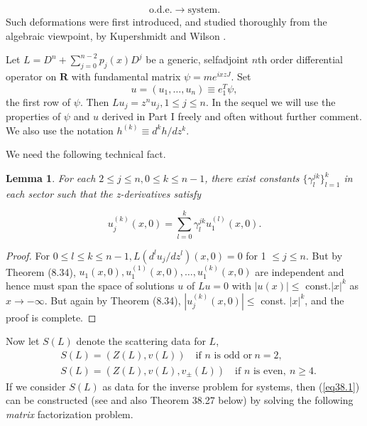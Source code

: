 \documentclass{surv-l}
\theoremstyle{plain}
\newtheorem{lem}[theorem]{\sc Lemma}
\theoremstyle{definition}
\numberwithin{equation}{chapter}
\begin{document}
\begin{equation*}
\mathrm{o.d.e}. \rightarrow \mathrm{system}.
\end{equation*}
Such deformations were first introduced, and studied thoroughly from the algebraic viewpoint, by Kupershmidt and Wilson \cite{KW}.

Let $L=D^{n}+ \sum_{j=0}^{n-2}p_{j}(x)D^{j}$ be a generic, selfadjoint $n$th order differential operator on $\textbf{R}$ with fundamental matrix $\psi=me^{ixzJ}$. Set
\begin{equation}\label{eq38.2}
u=(u_{1},\ldots,u_{n})\equiv e_{1}^{T}\psi,
\end{equation}
the first row of $\psi$. Then $Lu_{j}=z^{n}u_{j},1\leq j\leq n$. In the sequel we will use the properties of $\psi$ and $u$ derived in Part I freely and often without further comment. We also use the notation $h^{(k)}\equiv d^{k}h/dz^{k}$.

We need the following technical fact.
\renewcommand\thetheorem{38.\arabic{theorem}}
\setcounter{theorem}{2}
\begin{lem}\label{lem38.3}
For each $2\leq j\leq n, 0\leq k\leq n-1$, there exist constants $\{\gamma_{l}^{j k}\}_{l=1}^{k}$ in each sector such that the z-derivatives satisfy
\end{lem}
\setcounter{equation}{3}
\begin{equation}\label{eq38.4}
u_{j}^{(k)}(x,0)=\sum_{l=0}^{k}\gamma_{l}^{jk}u_{1}^{(l)}(x,0).
\end{equation}

\begin{proof}
For $0\leq l\leq k\leq n -1, L(d^{l}u_{j}/dz^{l})(x,0)=0$ for 1 $\leq j\leq n.$ But by Theorem (8.34), $u_{1}(x, 0),u_{1}^{(1)}(x, 0),\ldots,u_{1}^{(k)}(x,0)$ are independent and hence must span the space of solutions $u$ of $Lu=0$ with $|u(x)|\leq$ const.$|x|^{k}$ as $ x\rightarrow-\infty$. But again by Theorem (8.34), $|u_{j}^{(k)}(x, 0)|\leq$ const. $|x|^{k}$, and the proof is complete.
\end{proof}

Now let $S(L)$ denote the scattering data for $L$,
\begin{align*}
&S(L)=(Z(L),v(L))\quad \text{if $n$ is odd or}\ n =2, \\
&S(L)=(Z(L),v(L),v_{\pm}(L))\quad \text{if $n$ is even},\ n\geq 4.
\end{align*}
If we consider $S(L)$ as data for the inverse problem for systems, then (\ref{eq38.1}) can be constructed (see \cite{BC1} and also Theorem 38.27 below) by solving the following \emph{matrix} factorization problem.
\end{document}
